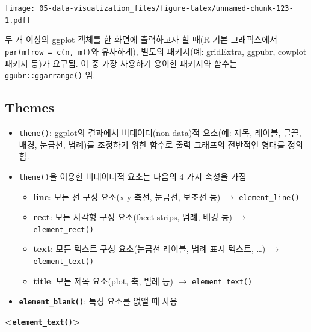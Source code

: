 \documentclass[
  11pt,
]{krantz}
\makeatletter
\providecommand{\tightlist}{%
  \setlength{\itemsep}{0pt}\setlength{\parskip}{0pt}}
\newenvironment{kframe}{%
\medskip{}
\setlength{\fboxsep}{.8em}
 \def\at@end@of@kframe{}%
 \ifinner\ifhmode%
  \def\at@end@of@kframe{\end{minipage}}%
  \begin{minipage}{\columnwidth}%
 \fi\fi%
 \def\FrameCommand##1{\hskip\@totalleftmargin \hskip-\fboxsep
 \colorbox{shadecolor}{##1}\hskip-\fboxsep
     \hskip-\linewidth \hskip-\@totalleftmargin \hskip\columnwidth}%
 \MakeFramed {\advance\hsize-\width
   \@totalleftmargin\z@ \linewidth\hsize
   \@setminipage}}%
 {\par\unskip\endMakeFramed%
 \at@end@of@kframe}
\newenvironment{rmdblock}[1]
  {
  \begin{itemize}
  \renewcommand{\labelitemi}{
    \raisebox{-.7\height}[0pt][0pt]{
      {\setkeys{Gin}{width=3em,keepaspectratio}\texttt{[image: images/\#1]}}
    }
  }
  \setlength{\fboxsep}{1em}
  \begin{kframe}
  \item
  }
  {
  \end{kframe}
  \end{itemize}
  }
\newenvironment{rmdtip}
  {\begin{rmdblock}{tip}}
  {\end{rmdblock}}
\makeatother
\begin{document}
\texttt{[image: 05-data-visualization\_files/figure-latex/unnamed-chunk-123-1.pdf]}

\normalsize

\footnotesize

\begin{rmdtip}
\begin{rmdtip}

두 개 이상의 ggplot 객체를 한 화면에 출력하고자 할 때(R 기본 그래픽스에서 \texttt{par(mfrow\ =\ c(n,\ m))}와 유사하게), 별도의 패키지(예: gridExtra, ggpubr, cowplot 패키지 등)가 요구됨. 이 중 가장 사용하기 용이한 패키지와 함수는 \texttt{ggubr::ggarrange()} 임.

\end{rmdtip}
\end{rmdtip}

\normalsize

\hypertarget{themes}{%
\subsection{Themes}\label{themes}}

\begin{itemize}
\tightlist
\item
  \texttt{theme()}: ggplot의 결과에서 비데이터(non-data)적 요소(예: 제목, 레이블, 글꼴, 배경, 눈금선, 범례)를 조정하기 위한 함수로 출력 그래프의 전반적인 형태를 정의함.
\item
  \texttt{theme()}을 이용한 비데이터적 요소는 다음의 4 가지 속성을 가짐

  \begin{itemize}
  \tightlist
  \item
    \textbf{line}: 모든 선 구성 요소(x-y 축선, 눈금선, 보조선 등) \(\rightarrow\) \texttt{element\_line()}
  \item
    \textbf{rect}: 모든 사각형 구성 요소(facet strips, 범례, 배경 등) \(\rightarrow\) \texttt{element\_rect()}
  \item
    \textbf{text}: 모든 텍스트 구성 요소(눈금선 레이블, 범례 표시 텍스트, \ldots) \(\rightarrow\) \texttt{element\_text()}
  \item
    \textbf{title}: 모든 제목 요소(plot, 축, 범례 등) \(\rightarrow\) \texttt{element\_text()}
  \end{itemize}
\item
  \textbf{\texttt{element\_blank()}}: 특정 요소를 없앨 때 사용
\end{itemize}

\textbf{\textless{}\texttt{element\_text()}\textgreater{}}
\end{document}
